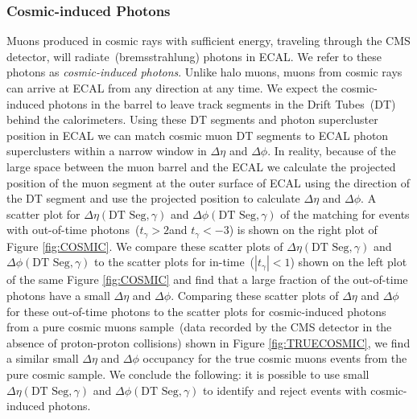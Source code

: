 \subsubsection{Cosmic-induced Photons} 
Muons produced in cosmic rays with sufficient energy, traveling through the CMS detector, will radiate~(bremsstrahlung) photons in ECAL. We refer to these photons as \textit{cosmic-induced photons}. Unlike halo muons, muons from cosmic rays can arrive at ECAL from any direction at any time. We expect the cosmic-induced photons in the barrel to leave track segments in the Drift Tubes~(DT) behind the calorimeters.
\newline
 Using these DT segments and  photon supercluster position in ECAL we can match cosmic muon DT segments to ECAL photon superclusters within a narrow window in $\Delta\eta$ and $\Delta\phi$. In reality, because of the large space between the muon barrel and the ECAL we calculate the projected position of the muon segment at the outer surface of ECAL using the direction of the DT segment and use the projected position to calculate $\Delta\eta$ and $\Delta\phi$. A scatter plot for $\Delta\eta(\mbox{DT Seg},\gamma)$ and $\Delta\phi(\mbox{DT Seg},\gamma)$ of the matching for events with out-of-time photons~($t_{\gamma} > 2$\ns and $t_{\gamma} < -3$\ns) is shown on the right plot of Figure \ref{fig:COSMIC}. We compare these scatter plots of $\Delta\eta(\mbox{DT Seg},\gamma)$ and $\Delta\phi(\mbox{DT Seg},\gamma)$ to the scatter plots for in-time~($|t_{\gamma}| < 1$\ns) shown on the left plot of the same Figure \ref{fig:COSMIC} and find that a large fraction of the out-of-time photons have a small $\Delta\eta$ and $\Delta\phi$. 
 \newline
Comparing these scatter plots of $\Delta\eta$  and $\Delta\phi$ for these out-of-time photons to the scatter plots for cosmic-induced photons from a pure cosmic muons sample~(data recorded by the CMS detector in the absence of proton-proton collisions) shown in Figure \ref{fig:TRUECOSMIC}, we find a similar small $\Delta\eta$ and $\Delta\phi$ occupancy for the true cosmic muons events from the pure cosmic sample. We conclude the following: it is possible to use small $\Delta\eta(\mbox{DT Seg},\gamma)$  and $\Delta\phi(\mbox{DT Seg},\gamma)$ to identify and reject events with cosmic-induced photons.


